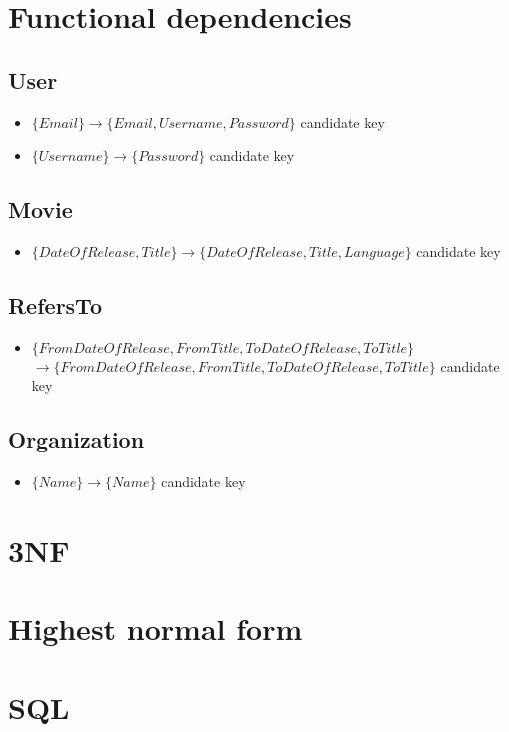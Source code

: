 \section{Functional dependencies}

\subsection*{User}
\begin{itemize}
\item{$\{Email\} \rightarrow \{Email, Username, Password\}$} candidate key
\item{$\{Username\} \rightarrow \{Password\}$ candidate key}
\end{itemize}

\subsection*{Movie}
\begin{itemize}
\item{$\{DateOfRelease, Title\} \rightarrow \{DateOfRelease, Title, Language\}$ candidate key}
\end{itemize}

\subsection*{RefersTo}
\begin{itemize}
\item{$\{FromDateOfRelease, FromTitle, ToDateOfRelease, ToTitle\}$\\
$\rightarrow \{FromDateOfRelease, FromTitle, ToDateOfRelease, ToTitle\}$ candidate key}
\end{itemize}

\subsection*{Organization}
\begin{itemize}
\item{$\{Name\} \rightarrow \{Name\}$ candidate key}
\end{itemize}

\section{3NF}

\section{Highest normal form}

\section{SQL}